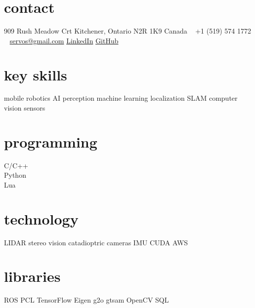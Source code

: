 \documentclass[stdletter]{friggeri-cv} %
\begin{document}

\bodyfont

\begin{aside} %
\section{contact}
909 Rush Meadow Crt
Kitchener, Ontario
N2R 1K9
Canada
~
+1 (519) 574 1772
~
{} \href{mailto:servos@gmail.com}{servos@gmail.com}
{\color{blue}{\faLinkedin}} \href{www.linkedin.com/in/james-servos-89454855}{LinkedIn}
{\color{purple}{\faGithub}} \href{https://github.com/servos}{GitHub}
~
\section{key skills}
{\color{red}{\faCogs}} mobile robotics 
AI
perception 
machine learning
localization
SLAM
computer vision
sensors 
~
\section{programming}
{\color{purple}{\faPowerOff}} C/C++ \\ Python \\ Lua
~
\section{technology}
LIDAR
stereo vision
catadioptric cameras
IMU
CUDA
AWS
~
\section{libraries}
ROS
PCL
TensorFlow
Eigen
g2o
gtsam
OpenCV
SQL
~
\end{aside}
% 
\end{document}
